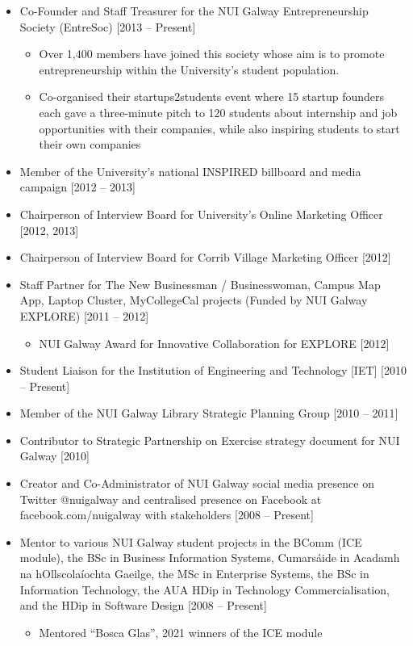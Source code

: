 \documentclass[10pt,a4paper]{res} %
\begin{document}
\begin{resume}
\begin{itemize}
\item Co-Founder and Staff Treasurer for the NUI Galway Entrepreneurship Society (EntreSoc) [2013 -- Present]
\begin{itemize} \itemsep -2pt
\item Over 1,400 members have joined this society whose aim is to promote entrepreneurship within the University's student population.
\item Co-organised their startups2students event where 15 startup founders each gave a three-minute pitch to 120 students about internship and job opportunities with their companies, while also inspiring students to start their own companies
\end{itemize}
\item Member of the University's national INSPIRED billboard and media campaign [2012 -- 2013] 
\item Chairperson of Interview Board for University's Online Marketing Officer [2012, 2013]
\item Chairperson of Interview Board for Corrib Village Marketing Officer [2012]
\item Staff Partner for The New Businessman / Businesswoman, Campus Map App, Laptop Cluster, MyCollegeCal projects (Funded by NUI Galway EXPLORE) [2011 -- 2012]
\begin{itemize} \itemsep -2pt
\item NUI Galway Award for Innovative Collaboration for EXPLORE [2012]
\end{itemize}
\item Student Liaison for the Institution of Engineering and Technology [IET] [2010 -- Present]
\item Member of the NUI Galway Library Strategic Planning Group [2010 -- 2011]
\item Contributor to Strategic Partnership on Exercise strategy document for NUI Galway [2010]
\item Creator and Co-Administrator of NUI Galway social media presence on Twitter @nuigalway and centralised presence on Facebook at facebook.com/nuigalway with stakeholders [2008 -- Present]
\item Mentor to various NUI Galway student projects in the BComm (ICE module), the BSc in Business Information Systems, Cumars\'{a}ide in Acadamh na hOllscola\'{i}ochta Gaeilge, the MSc in Enterprise Systems, the BSc in Information Technology, the AUA HDip in Technology Commercialisation, and the HDip in Software Design [2008 -- Present]
\begin{itemize} \itemsep -2pt
\item Mentored ``Bosca Glas'', 2021 winners of the ICE module
\end{itemize}
\end{itemize}


\end{resume}
\end{document}
